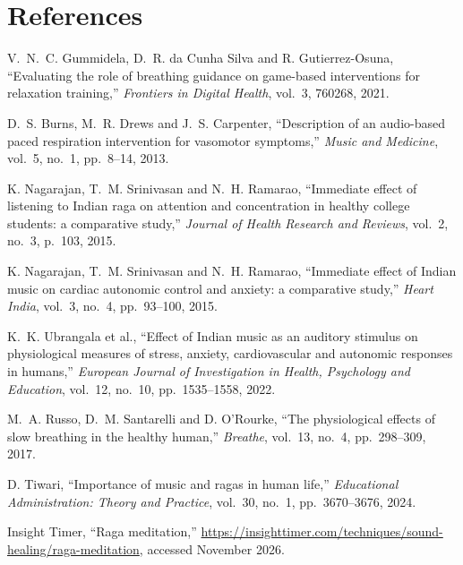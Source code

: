 \documentclass[11pt,a4paper]{article}
\begin{document}
\section*{References}
\small
\begin{enumerate}[label={[\arabic*]},leftmargin=*]
\item V.~N.~C. Gummidela, D.~R. da Cunha Silva and R. Gutierrez-Osuna, ``Evaluating the role of breathing guidance on game-based interventions for relaxation training,'' \emph{Frontiers in Digital Health}, vol.~3, 760268, 2021.
\item D.~S. Burns, M.~R. Drews and J.~S. Carpenter, ``Description of an audio-based paced respiration intervention for vasomotor symptoms,'' \emph{Music and Medicine}, vol.~5, no.~1, pp.~8--14, 2013.
\item K. Nagarajan, T.~M. Srinivasan and N.~H. Ramarao, ``Immediate effect of listening to Indian raga on attention and concentration in healthy college students: a comparative study,'' \emph{Journal of Health Research and Reviews}, vol.~2, no.~3, p.~103, 2015.
\item K. Nagarajan, T.~M. Srinivasan and N.~H. Ramarao, ``Immediate effect of Indian music on cardiac autonomic control and anxiety: a comparative study,'' \emph{Heart India}, vol.~3, no.~4, pp.~93--100, 2015.
\item K.~K. Ubrangala et al., ``Effect of Indian music as an auditory stimulus on physiological measures of stress, anxiety, cardiovascular and autonomic responses in humans,'' \emph{European Journal of Investigation in Health, Psychology and Education}, vol.~12, no.~10, pp.~1535--1558, 2022.
\item M.~A. Russo, D.~M. Santarelli and D. O'Rourke, ``The physiological effects of slow breathing in the healthy human,'' \emph{Breathe}, vol.~13, no.~4, pp.~298--309, 2017.
\item D. Tiwari, ``Importance of music and ragas in human life,'' \emph{Educational Administration: Theory and Practice}, vol.~30, no.~1, pp.~3670--3676, 2024.
\item Insight Timer, ``Raga meditation,'' \url{https://insighttimer.com/techniques/sound-healing/raga-meditation}, accessed November 2026.
\end{enumerate}
\end{document}
